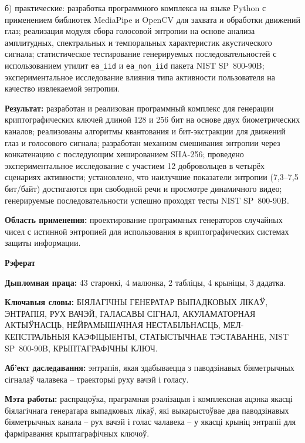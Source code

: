 \documentclass[14pt, a4paper]{extreport}
\begin{document}
б) практические: разработка программного комплекса на языке Python с
применением библиотек MediaPipe и OpenCV для захвата и обработки движений
глаз; реализация модуля сбора голосовой энтропии на основе анализа
амплитудных, спектральных и темпоральных характеристик акустического сигнала;
статистическое тестирование генерируемых последовательностей с использованием
утилит \texttt{ea\_iid} и \texttt{ea\_non\_iid} пакета NIST SP~800-90B;
экспериментальное исследование влияния типа активности пользователя на
качество извлекаемой энтропии.
 
\textbf{Результат:} разработан и реализован программный комплекс для генерации
криптографических ключей длиной 128 и 256 бит на основе двух биометрических
каналов; реализованы алгоритмы квантования и бит-экстракции для движений глаз
и голосового сигнала; разработан механизм смешивания энтропии через
конкатенацию с последующим хешированием SHA-256; проведено
экспериментальное исследование с участием 12 добровольцев в четырёх сценариях
активности; установлено, что наилучшие показатели энтропии (7{,}3--7{,}5
бит/байт) достигаются при свободной речи и просмотре динамичного видео;
генерируемые последовательности успешно проходят тесты NIST SP~800-90B.
 
\textbf{Область применения:} проектирование программных генераторов случайных
чисел с истинной энтропией для использования в криптографических системах
защиты информации.
 
 
 
\newpage
\begin{center}{\bf \Large Рэферат}\end{center}
 
\textbf{Дыпломная праца:} 43 старонкі, 4 малюнка, 2 табліцы, 4 крыніцы, 3 дадатка.
 
\textbf{Ключавыя словы:} БІЯЛАГІЧНЫ ГЕНЕРАТАР ВЫПАДКОВЫХ ЛІКАЎ, ЭНТРАПІЯ,
РУХ ВАЧЭЙ, ГАЛАСАВЫ СІГНАЛ, АКУЛАМАТОРНАЯ АКТЫЎНАСЦЬ, НЕЙРАМЫШАЧНАЯ
НЕСТАБІЛЬНАСЦЬ, МЕЛ-КЕПСТРАЛЬНЫЯ КАЭФІЦЫЕНТЫ, СТАТЫСТЫЧНАЕ ТЭСТАВАННЕ,
NIST SP~800-90B, КРЫПТАГРАФІЧНЫ КЛЮЧ.
 
\textbf{Аб'ект даследавання:} энтрапія, якая здабываецца з паводзінавых
біяметрычных сігналаў чалавека -- траекторыі руху вачэй і голасу.
 
\textbf{Мэта работы:} распрацоўка, праграмная рэалізацыя і комплексная ацэнка
якасці біялагічнага генератара выпадковых лікаў, які выкарыстоўвае два
паводзінавых біяметрычных канала -- рух вачэй і голас чалавека -- у якасці
крыніц энтрапіі для фарміравання крыптаграфічных ключоў.
 
\end{document}
